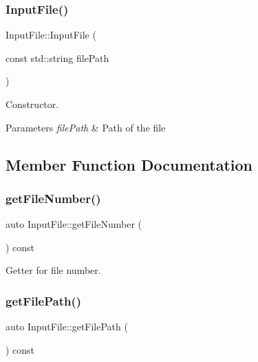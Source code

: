 \subsubsection{\texorpdfstring{Input\+File()}{InputFile()}}
{\footnotesize\ttfamily Input\+File\+::\+Input\+File (\begin{DoxyParamCaption}\item[{const std\+::string}]{file\+Path }\end{DoxyParamCaption})}



Constructor. 


\begin{DoxyParams}{Parameters}
{\em file\+Path} & Path of the file \\
\hline
\end{DoxyParams}


\subsection{Member Function Documentation}
\mbox{\label{class_input_file_a1a1a9c0d87f77e580e03da608b1b5291}} 
\subsubsection{\texorpdfstring{get\+File\+Number()}{getFileNumber()}}
{\footnotesize\ttfamily auto Input\+File\+::get\+File\+Number (\begin{DoxyParamCaption}{ }\end{DoxyParamCaption}) const\hspace{0.3cm}{\ttfamily [inline]}}



Getter for file number. 

\mbox{\label{class_input_file_a2e3685bddcae984f458e7fc6a20e7a44}} 
\subsubsection{\texorpdfstring{get\+File\+Path()}{getFilePath()}}
{\footnotesize\ttfamily auto Input\+File\+::get\+File\+Path (\begin{DoxyParamCaption}{ }\end{DoxyParamCaption}) const\hspace{0.3cm}{\ttfamily [inline]}}



